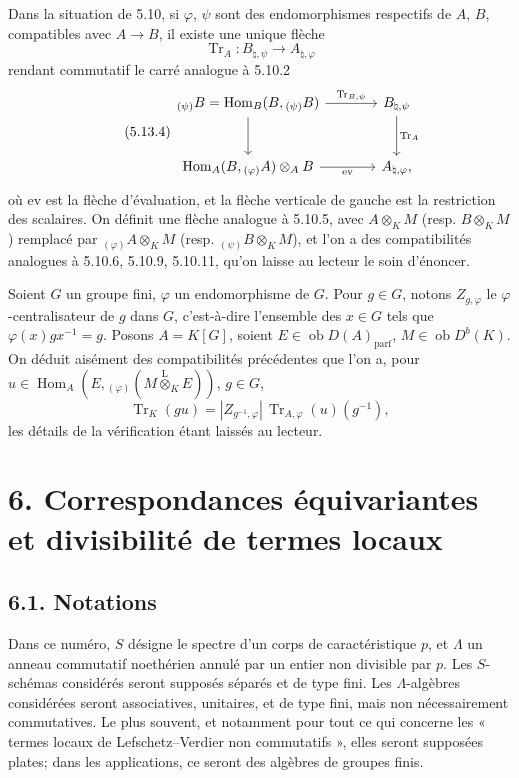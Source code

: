 \documentclass[11pt]{article}
\DeclareMathOperator{\Hom}{Hom}
\newcommand{\ob}{\operatorname{ob}}
\providecommand{\Tr}{\operatorname{Tr}}
\providecommand{\Tr}{\operatorname{Tr}}
\providecommand{\lten}{\overset{\mathrm L}{\otimes}}
\providecommand{\Tr}{\operatorname{Tr}}
\providecommand{\Hom}{\operatorname{Hom}}
\providecommand{\ob}{\operatorname{ob}}
\providecommand{\lten}{\overset{\mathrm L}{\otimes}}
\providecommand{\lten}{\overset{\mathrm L}{\otimes}}
\providecommand{\Tr}{\operatorname{Tr}}
\providecommand{\lten}{\overset{\mathrm L}{\otimes}}
\providecommand{\lten}{\overset{\mathrm L}{\otimes}}
\providecommand{\lten}{\overset{\mathrm L}{\otimes}}
\begin{document}
Dans la situation de 5.10, si $\varphi$, $\psi$ sont des endomorphismes respectifs de $A$, $B$, compatibles avec $A\to B$, il existe une unique flèche
\[
\Tr_A:B_{\natural,\psi}\longrightarrow A_{\natural,\varphi}
\]
rendant commutatif le carré analogue à 5.10.2
\begin{equation}\tag{5.13.4}
\begin{tikzcd}[column sep=large,row sep=large]
{}_{(\psi)}B=\Hom_B(B,{}_{(\psi)}B) \arrow[r,"\Tr_{B,\psi}"] \arrow[d] & B_{\natural,\psi} \arrow[d,"\Tr_A"]\\
\Hom_A(B,{}_{(\varphi)}A)\otimes_AB \arrow[r,"\mathrm{ev}"'] & A_{\natural,\varphi},
\end{tikzcd}
\end{equation}
où $\mathrm{ev}$ est la flèche d'évaluation, et la flèche verticale de gauche est la restriction des scalaires. On définit une flèche analogue à 5.10.5, avec $A\otimes_KM$ (resp. $B\otimes_KM$) remplacé par ${}_{(\varphi)}A\otimes_KM$ (resp. ${}_{(\psi)}B\otimes_KM$), et l'on a des compatibilités analogues à 5.10.6, 5.10.9, 5.10.11, qu'on laisse au lecteur le soin d'énoncer.

Soient $G$ un groupe fini, $\varphi$ un endomorphisme de $G$. Pour $g\in G$, notons $Z_{g,\varphi}$ le $\varphi$-centralisateur de $g$ dans $G$, c'est-à-dire l'ensemble des $x\in G$ tels que $\varphi(x)gx^{-1}=g$. Posons $A=K[G]$, soient $E\in\ob D(A)_{\mathrm{parf}}$, $M\in\ob D^b(K)$. On déduit aisément des compatibilités précédentes que l'on a, pour $u\in\Hom_A(E,{}_{(\varphi)}(M\lten_KE))$, $g\in G$,
\begin{equation}\tag{5.13.5}
\Tr_K(gu)=|Z_{g^{-1},\varphi}|\,\Tr_{A,\varphi}(u)(g^{-1}),
\end{equation}
les détails de la vérification étant laissés au lecteur.

\section*{6. Correspondances équivariantes et divisibilité de termes locaux}

\subsection*{6.1. Notations}

Dans ce numéro, $S$ désigne le spectre d'un corps de caractéristique $p$, et $\Lambda$ un anneau commutatif noethérien annulé par un entier non divisible par $p$. Les $S$-schémas considérés seront supposés séparés et de type fini. Les $\Lambda$-algèbres considérées seront associatives, unitaires, et de type fini, mais non nécessairement commutatives. Le plus souvent, et notamment pour tout ce qui concerne les « termes locaux de Lefschetz--Verdier non commutatifs », elles seront supposées plates; dans les applications, ce seront des algèbres de groupes finis.
\end{document}
